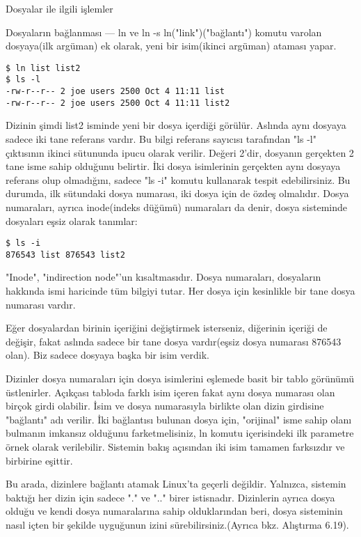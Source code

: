 \begin{section}{Dosyalar ile ilgili işlemler}
\begin{subsection}{Dosyaların bağlanması — ln ve ln -s}
ln("link")("bağlantı") komutu varolan dosyaya(ilk argüman) ek olarak, yeni bir isim(ikinci argüman) ataması yapar.
\begin{verbatim}
$ ln list list2
$ ls -l
-rw-r--r-- 2 joe users 2500 Oct 4 11:11 list
-rw-r--r-- 2 joe users 2500 Oct 4 11:11 list2
\end{verbatim}
Dizinin şimdi list2 isminde yeni bir dosya içerdiği görülür. Aslında aynı dosyaya sadece iki tane referans vardır. Bu bilgi referans sayıcısı tarafından "ls -l" çıktısının ikinci sütununda ipucu olarak verilir. Değeri 2'dir, dosyanın gerçekten 2 tane isme sahip olduğunu belirtir. İki dosya isimlerinin gerçekten aynı dosyaya referans olup olmadığını, sadece "ls -i" komutu kullanarak tespit edebilirsiniz. Bu durumda, ilk sütundaki dosya numarası, iki dosya için de özdeş olmalıdır. Dosya numaraları, ayrıca inode(indeks düğümü) numaraları da denir, dosya sisteminde dosyaları eşsiz olarak tanımlar:
\begin{verbatim}
$ ls -i
876543 list 876543 list2
\end{verbatim}
"Inode", "indirection node"'un kısaltmasıdır. Dosya numaraları, dosyaların hakkında ismi haricinde tüm bilgiyi tutar. Her dosya için kesinlikle bir tane dosya numarası vardır.

Eğer dosyalardan birinin içeriğini değiştirmek isterseniz, diğerinin içeriği de değişir, fakat aslında sadece bir tane dosya vardır(eşsiz dosya numarası 876543 olan). Biz sadece dosyaya başka bir isim verdik.

Dizinler dosya numaraları için dosya isimlerini eşlemede basit bir tablo görünümü üstlenirler. Açıkçası tabloda farklı isim içeren fakat aynı dosya numarası olan birçok girdi olabilir. İsim ve dosya numarasıyla birlikte olan dizin girdisine "bağlantı" adı verilir. İki bağlantısı bulunan dosya için, "orijinal" isme sahip olanı bulmanın imkansız olduğunu farketmelisiniz, ln komutu içerisindeki ilk parametre örnek olarak verilebilir. Sistemin bakış açısından iki isim tamamen farksızdır ve birbirine eşittir.

Bu arada, dizinlere bağlantı atamak Linux'ta geçerli değildir. Yalnızca, sistemin baktığı her dizin için  sadece "." ve ".." birer istisnadır. Dizinlerin ayrıca dosya olduğu ve kendi dosya numaralarına sahip olduklarından beri, dosya sisteminin nasıl içten bir şekilde uyguğunun izini sürebilirsiniz.(Ayrıca bkz. Alıştırma 6.19).


\end{subsection}
\end{section}
